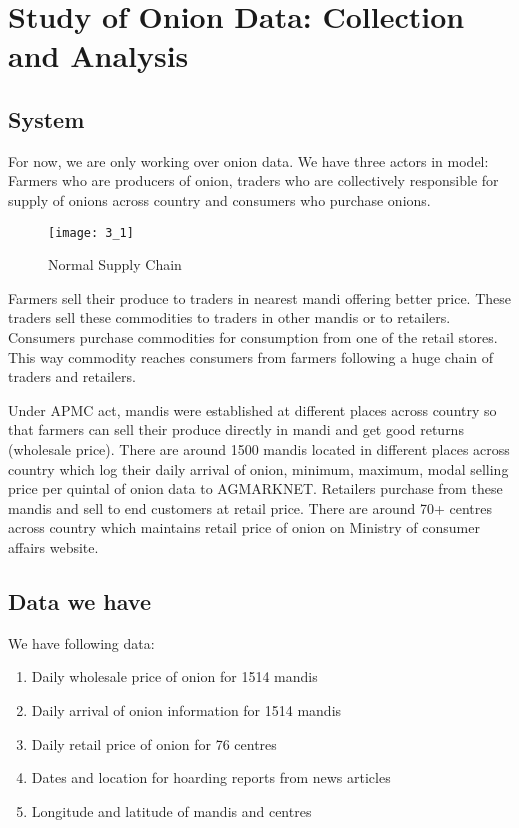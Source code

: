 \chapter{Study of Onion Data: Collection and Analysis}


\section{System}

For now, we are only working over onion data. We have three actors in model: Farmers who are producers of onion, traders who are collectively responsible for supply of onions across country and consumers who purchase onions.

\begin{figure}[here]
\begin{center}	
\texttt{[image: 3\_1]} 
\caption{Normal Supply Chain}
\label{fig:Normal Supply Chain}
\end{center}
\end{figure}

Farmers sell their produce to traders in nearest mandi offering better price. These traders sell these commodities to traders in other mandis or to retailers. Consumers purchase commodities for consumption from one of the retail stores. This way commodity reaches consumers from farmers following a huge chain of traders and retailers.

Under APMC act, mandis were established at different places across country so that farmers can sell their produce directly in mandi and get good returns (wholesale price). There are around 1500 mandis located in different places across country which log their daily arrival of onion, minimum, maximum, modal selling price per quintal of onion data to AGMARKNET. Retailers purchase from these mandis and sell to end customers at retail price. There are around 70+ centres across country which maintains retail price of onion on Ministry of consumer affairs website.

\section{Data we have}

We have following data:

\begin{enumerate}

\item Daily wholesale price of onion for 1514 mandis 
\item Daily arrival of onion information for 1514 mandis
\item Daily retail price of onion for 76 centres
\item Dates and location for hoarding reports from news articles
\item Longitude and latitude of mandis and centres

\end{enumerate}

